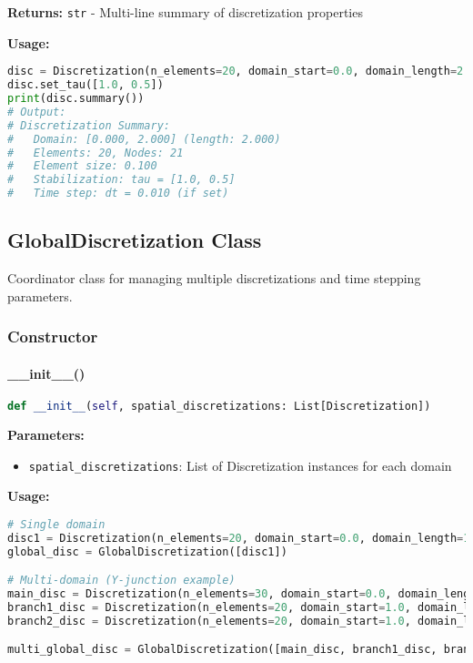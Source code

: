 \textbf{Returns:} \texttt{str} - Multi-line summary of discretization properties

\textbf{Usage:}
\begin{lstlisting}[language=Python, caption=Summary Usage]
disc = Discretization(n_elements=20, domain_start=0.0, domain_length=2.0)
disc.set_tau([1.0, 0.5])
print(disc.summary())
# Output:
# Discretization Summary:
#   Domain: [0.000, 2.000] (length: 2.000)
#   Elements: 20, Nodes: 21
#   Element size: 0.100
#   Stabilization: tau = [1.0, 0.5]
#   Time step: dt = 0.010 (if set)
\end{lstlisting}

\subsection{GlobalDiscretization Class}
\label{subsec:globaldiscretization_class}

Coordinator class for managing multiple discretizations and time stepping parameters.

\subsubsection{Constructor}

\paragraph{\_\_init\_\_()}
\begin{lstlisting}[language=Python, caption=GlobalDiscretization Constructor]
def __init__(self, spatial_discretizations: List[Discretization])
\end{lstlisting}

\textbf{Parameters:}
\begin{itemize}
    \item \texttt{spatial\_discretizations}: List of Discretization instances for each domain
\end{itemize}

\textbf{Usage:}
\begin{lstlisting}[language=Python, caption=GlobalDiscretization Usage]
# Single domain
disc1 = Discretization(n_elements=20, domain_start=0.0, domain_length=1.0)
global_disc = GlobalDiscretization([disc1])

# Multi-domain (Y-junction example)
main_disc = Discretization(n_elements=30, domain_start=0.0, domain_length=1.0)
branch1_disc = Discretization(n_elements=20, domain_start=1.0, domain_length=0.8)
branch2_disc = Discretization(n_elements=20, domain_start=1.0, domain_length=0.8)

multi_global_disc = GlobalDiscretization([main_disc, branch1_disc, branch2_disc])
\end{lstlisting}

